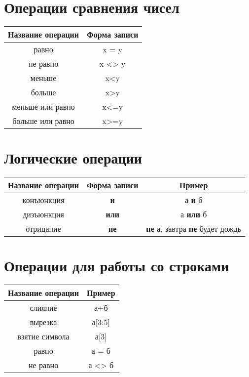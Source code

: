 \section{Операции сравнения чисел}
\begin{center}
\begin{tabular}{||c|c||}
\hline
\hline
\textbf{Название операции} &
\textbf{Форма записи} \\
\hline
равно&
x = y\\
не равно&
x <> y\\
меньше&
x<y\\
больше&
x>y\\
меньше или равно&
x<=y\\
больше или равно&
x>=y\\
\hline
\hline
\end{tabular}
\end{center}

\section{Логические операции}
\begin{center}
\begin{tabular}{||c|c||c||}
\hline
\hline
\textbf{Название операции} &
\textbf{Форма записи} &
\textbf{Пример} \\
\hline
конъюнкция & \textbf{и} & а \textbf{и} б\\
дизъюнкция & \textbf{или} & а \textbf{или} б\\
отрицание & \textbf{не} & \textbf{не} а, завтра \textbf{не} будет дождь\\
\hline
\hline
\end{tabular}
\end{center}

\section{Операции для работы со строками}
\begin{center}
\begin{tabular}{||c|c||}
\hline
\hline
\textbf{Название операции} &
\textbf{Пример} \\
\hline
слияние & а+б\\
вырезка & а[3:5]\\
взятие символа & а[3]\\
\hline
равно&
а = б\\
не равно&
а <> б\\
\hline
\hline
\end{tabular}
\end{center}


